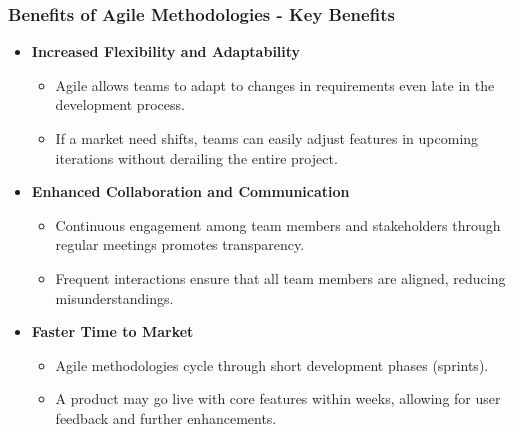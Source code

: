 \documentclass{beamer}
\begin{document}
\begin{frame}[fragile]
    \frametitle{Benefits of Agile Methodologies - Key Benefits}
    \begin{itemize}
        \item \textbf{Increased Flexibility and Adaptability}
            \begin{itemize}
                \item Agile allows teams to adapt to changes in requirements even late in the development process.
                \item If a market need shifts, teams can easily adjust features in upcoming iterations without derailing the entire project.
            \end{itemize}

        \item \textbf{Enhanced Collaboration and Communication}
            \begin{itemize}
                \item Continuous engagement among team members and stakeholders through regular meetings promotes transparency.
                \item Frequent interactions ensure that all team members are aligned, reducing misunderstandings.
            \end{itemize}

        \item \textbf{Faster Time to Market}
            \begin{itemize}
                \item Agile methodologies cycle through short development phases (sprints).
                \item A product may go live with core features within weeks, allowing for user feedback and further enhancements.
            \end{itemize}
    \end{itemize}
\end{frame}
\end{document}
